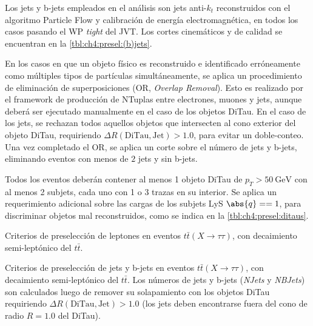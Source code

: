 Los jets y b-jets empleados en el análisis son jets anti-$k_t$ reconstruidos con el algoritmo Particle Flow y calibración de energía electromagnética, en todos los casos pasando el WP \textit{tight} del JVT. Los cortes cinemáticos y de calidad se encuentran en la \cref{tbl:ch4:presel:(b)jets}.

En los casos en que un objeto físico es reconstruido e identificado erróneamente como múltiples tipos de partículas simultáneamente, se aplica un procedimiento de eliminación de superposiciones (OR, \textit{Overlap Removal}). Esto es realizado por el framework de producción de NTuplas entre electrones, muones y jets, aunque deberá ser ejecutado manualmente en el caso de los objetos DiTau. En el caso de los jets, se rechazan todos aquellos objetos que intersecten al cono exterior del objeto DiTau, requiriendo $\Delta R(\text{DiTau}, \text{Jet}) > 1.0$, para evitar un doble-conteo. Una vez completado el OR, se aplica un corte sobre el número de jets y b-jets, eliminando eventos con menos de $2$ jets y sin b-jets.

Todos los eventos deberán contener al menos 1 objeto DiTau de $p_T > \SI{50}{\GeV}$ con al menos 2 subjets, cada uno con 1 o 3 trazas en su interior. Se aplica un requerimiento adicional sobre las cargas de los subjets LyS $\abs{q} == 1$, para discriminar objetos mal reconstruidos, como se indica en la \cref{tbl:ch4:presel:ditaus}.

\begin{table}[t]
    \small\centering
    \setlength{\tabcolsep}{1mm}
    
    \caption{Criterios de preselección de leptones en eventos $t\bar{t}(X\to\tau\tau)$, con decaimiento semi-leptónico del $t\bar{t}$.}
    \label{tbl:ch4:presel:leptons}
\end{table}

\begin{table}[t]
    \small\centering
    \setlength{\tabcolsep}{1mm}
    
    \caption{Criterios de preselección de jets y b-jets en eventos $t\bar{t}(X\to\tau\tau)$, con decaimiento semi-leptónico del $t\bar{t}$. Los números de jets y b-jets (\textit{NJets} y \textit{NBJets}) son calculados luego de remover su solapamiento con los objetos DiTau requiriendo $\Delta R(\text{DiTau}, \text{Jet}) > 1.0$ (los jets deben encontrarse fuera del cono de radio $R = 1.0$ del DiTau).}
    \label{tbl:ch4:presel:(b)jets}
\end{table}

